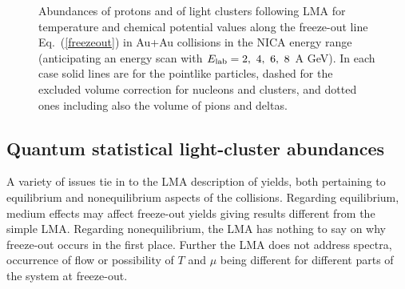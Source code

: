 \documentclass[epj]{svjour}
\begin{document}
\begin{figure}[!h]
\caption{Abundances of protons and of light clusters following LMA  for temperature and chemical potential values along the freeze-out line Eq.~(\ref{freezeout}) in Au+Au collisions in the NICA energy range 
(anticipating an energy scan with $E_{\rm lab}=2,~4,~6,~8$  A GeV).
In each case solid lines are for the pointlike particles, dashed for the excluded volume correction  for nucleons and clusters, and dotted ones including also the volume of pions and deltas. 
\label{lma-pauli}      
}
\end{figure}

\subsection{Quantum statistical light-cluster abundances}

A variety of issues tie in to the LMA description of yields, both pertaining to equilibrium and nonequilibrium aspects of the collisions.
Regarding equilibrium, medium effects may affect freeze-out yields 
giving results different from the simple LMA.
Regarding nonequilibrium, the LMA has nothing to say on why freeze-out occurs in the first place.
Further the LMA does not address spectra, occurrence of flow or possibility of $T$ and $\mu$ being different for different parts of the system at freeze-out.
\end{document}
